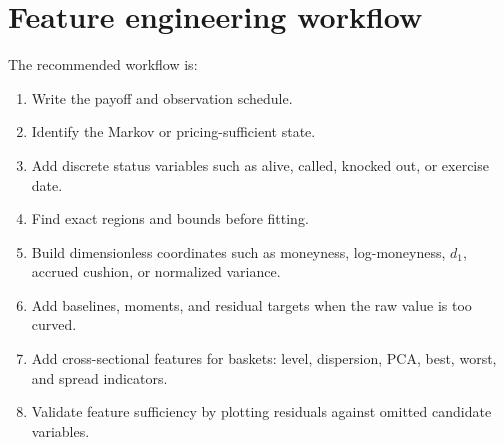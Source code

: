 \documentclass[11pt,oneside]{book}
\theoremstyle{definition}
\begin{document}
\section{Feature engineering workflow}
The recommended workflow is:
\begin{enumerate}
  \item Write the payoff and observation schedule.
  \item Identify the Markov or pricing-sufficient state.
  \item Add discrete status variables such as alive, called, knocked out, or
        exercise date.
  \item Find exact regions and bounds before fitting.
  \item Build dimensionless coordinates such as moneyness, log-moneyness,
        \(d_1\), accrued cushion, or normalized variance.
  \item Add baselines, moments, and residual targets when the raw value is too
        curved.
  \item Add cross-sectional features for baskets: level, dispersion, PCA, best,
        worst, and spread indicators.
  \item Validate feature sufficiency by plotting residuals against omitted
        candidate variables.
\end{enumerate}
\end{document}
